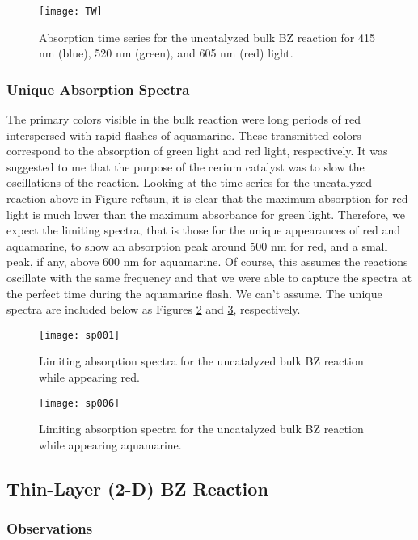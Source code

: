 \documentclass{article}
\begin{document}
\begin{figure}[H]
\texttt{[image: TW]}
\centering
\caption{Absorption time series for the uncatalyzed bulk BZ reaction for 415 nm 
(blue), 520 nm (green), and 605 nm (red) light.}
\label{tsun}
\end{figure}

\subsubsection{Unique Absorption Spectra}

The primary colors visible in the bulk reaction were long periods of red interspersed with
rapid flashes of aquamarine. These
transmitted colors correspond to the absorption of green light and red light, respectively.
It was suggested to me that the purpose of the cerium catalyst was to slow the oscillations
of the reaction. Looking at the time series for the uncatalyzed reaction above in Figure
ref{tsun}, it is clear that the maximum absorption for red light is much lower than the 
maximum absorbance for green light. Therefore, we expect the limiting spectra, that is those
for the unique appearances of red and aquamarine, to show an absorption peak around
500 nm for red, and a small peak, if any, above 600 nm for aquamarine. Of course, this
assumes the reactions oscillate with the same frequency and that we were able to capture
the spectra at the perfect time during the aquamarine flash. We can't assume.
The unique spectra are included below as Figures \ref{spr} and \ref{spaq}, respectively.

\begin{figure}[H]
\texttt{[image: sp001]}
\centering
\caption{Limiting absorption spectra for the uncatalyzed bulk BZ reaction while appearing
 red.}
\label{spr}
\end{figure}

\begin{figure}[H]
\texttt{[image: sp006]}
\centering
\caption{Limiting absorption spectra for the uncatalyzed bulk BZ reaction while appearing
aquamarine. }
\label{spaq}
\end{figure}

\subsection{Thin-Layer (2-D) BZ Reaction}

\subsubsection{Observations}
\end{document}
